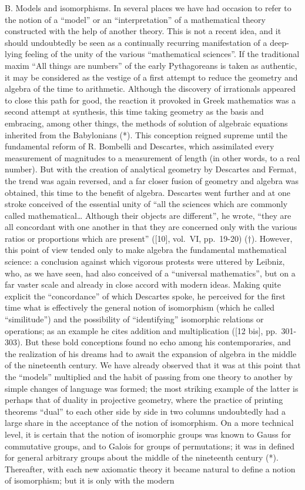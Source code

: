B. Models and isomorphisms. In several places we have had occasion to refer to the notion of a ``model'' or an ``interpretation'' of a mathematical theory constructed with the help of another theory. This is not a recent idea, and it should undoubtedly be seen as a continually recurring manifestation of a deep-lying feeling of the unity of the various ``mathematical sciences''. If the traditional maxim ``All things are numbers'' of the early Pythagoreans is taken as authentic, it may be considered as the vestige of a first attempt to reduce the geometry and algebra of the time to arithmetic. Although the discovery of irrationals appeared to close this path for good, the reaction it provoked in Greek mathematics was a second attempt at synthesis, this time taking geometry as the basis and embracing, among other things, the methods of solution of algebraic equations inherited from the Babylonians (*). This conception reigned supreme until the fundamental reform of R. Bombelli and Descartes, which assimilated every measurement of magnitudes to a measurement of length (in other words, to a real number). But with the creation of analytical geometry by Descartes and Fermat, the trend was again reversed, and a far closer fusion of geometry and algebra was obtained, this time to the benefit of algebra. Descartes went further and at one stroke conceived of the essential unity of ``all the sciences which are commonly called mathematical\ldots{} Although their objects are different'', he wrote, ``they are all concordant with one another in that they are concerned only with the various ratios or proportions which are present'' ({[}10{]}, vol.~VI, pp.~19-20) (†). However, this point of view tended only to make algebra the fundamental mathematical science: a conclusion against which vigorous protests were uttered by Leibniz, who, as we have seen, had also conceived of a ``universal mathematics'', but on a far vaster scale and already in close accord with modern ideas. Making quite explicit the ``concordance'' of which Descartes spoke, he perceived for the first time what is effectively the general notion of isomorphism (which he called ``similitude'') and the possibility of ``identifying'' isomorphic relations or operations; as an example he cites addition and multiplication ({[}12 bis{]}, pp.~301-303). But these bold conceptions found no echo among his contemporaries, and the realization of his dreams had to await the expansion of algebra in the middle of the nineteenth century. We have already observed that it was at this point that the ``models'' multiplied and the habit of passing from one theory to another by simple changes of language was formed; the most striking example of the latter is perhaps that of duality in projective geometry, where the practice of printing theorems ``dual'' to each other side by side in two columns undoubtedly had a large share in the acceptance of the notion of isomorphism. On a more technical level, it is certain that the notion of isomorphic groups was known to Gauss for commutative groups, and to Galois for groups of permutations; it was in defined for general arbitrary groups about the middle of the nineteenth century (*). Thereafter, with each new axiomatic theory it became natural to define a notion of isomorphism; but it is only with the modern 